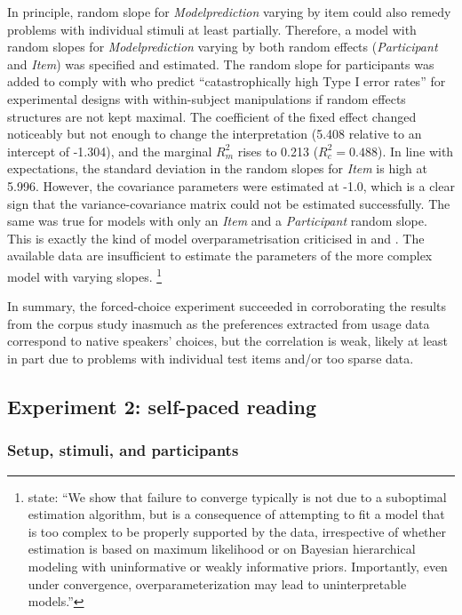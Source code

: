 In principle, random slope for \textit{Modelprediction} varying by item could also remedy problems with individual stimuli at least partially.
Therefore, a model with random slopes for \textit{Modelprediction} varying by both random effects (\textit{Participant} and \textit{Item}) was specified and estimated.
The random slope for participants was added to comply with \citet[257]{BarrEa2013} who predict ``catastrophically high Type I error rates'' for experimental designs with within-subject manipulations if random effects structures are not kept maximal.
The coefficient of the fixed effect changed noticeably but not enough to change the interpretation (5.408 relative to an intercept of -1.304), and the marginal $R^2_m$ rises to 0.213 ($R^2_c=0.488$).
In line with expectations, the standard deviation in the random slopes for \textit{Item} is high at 5.996.
However, the covariance parameters were estimated at -1.0, which is a clear sign that the variance-covariance matrix could not be estimated successfully.
The same was true for models with only an \textit{Item} and a \textit{Participant} random slope.
This is exactly the kind of model overparametrisation criticised in \citet{BatesEa2015a} and \citet{MatuschekEa2017}.
The available data are insufficient to estimate the parameters of the more complex model with varying slopes.%
\footnote{\citet[1]{BatesEa2015a} state: ``We show that failure to converge typically is not due to a suboptimal estimation algorithm, but is a consequence of attempting to fit a model that is too complex to be properly supported by the data, irrespective of whether estimation is based on maximum likelihood or on Bayesian hierarchical modeling with uninformative or weakly informative priors.
Importantly, even under convergence, overparameterization may lead to uninterpretable models.''
}

In summary, the forced-choice experiment succeeded in corroborating the results from the corpus study inasmuch as the preferences extracted from usage data correspond to native speakers' choices, but the correlation is weak, likely at least in part due to problems with individual test items and\slash or too sparse data.


\subsection{Experiment 2: self-paced reading}
\label{sec:exp:spr}

\subsubsection{Setup, stimuli, and participants}

